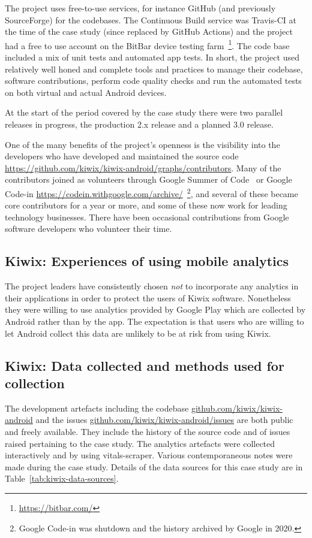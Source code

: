 The project uses free-to-use services, for instance GitHub (and previously SourceForge) for the codebases. The Continuous Build service was Travis-CI at the time of the case study (since replaced by GitHub Actions) and the project had a free to use account on the BitBar device testing farm~\footnote{\url{https://bitbar.com/}}. The code base included a mix of unit tests and automated app tests. In short, the project used relatively well honed and complete tools and practices to manage their codebase, software contributions, perform code quality checks and run the automated tests on both virtual and actual Android devices.

At the start of the period covered by the case study there were two parallel releases in progress, the production 2.x release and a planned 3.0 release.

One of the many benefits of the project’s openness is the visibility into the developers who have developed and maintained the source code \url{https://github.com/kiwix/kiwix-android/graphs/contributors}. Many of the contributors joined as volunteers through Google Summer of Code~ or Google Code-in \url{https://codein.withgoogle.com/archive/}~\footnote{Google Code-in was shutdown and the history archived by Google in 2020.}, and several of these became core contributors for a year or more, and some of these now work for leading technology businesses. There have been occasional contributions from Google software developers who volunteer their time.

\subsection{Kiwix: Experiences of using mobile analytics}
The project leaders have consistently chosen \emph{not} to incorporate any analytics in their applications in order to protect the users of Kiwix software. Nonetheless they were willing to use analytics provided by Google Play which are collected by Android rather than by the app. The expectation is that users who are willing to let Android collect this data are unlikely to be at risk from using Kiwix.

\subsection{Kiwix: Data collected and methods used for collection}
The development artefacts including the codebase \href{https://github.com/kiwix/kiwix-android}{github.com/kiwix/kiwix-android} and the issues \href{https://github.com/kiwix/kiwix-android/issues}{github.com/kiwix/kiwix-android/issues} are both public and freely available. They include the history of the source code and of issues raised pertaining to the case study. The analytics artefacts were collected interactively and by using vitals-scraper. Various contemporaneous notes were made during the case study.  Details of the data sources for this case study are in Table~\ref{tab:kiwix-data-sources}.

